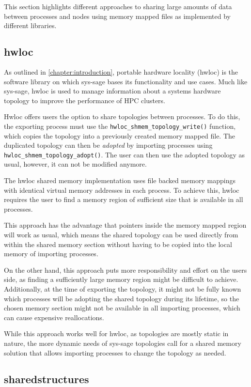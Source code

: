 This section highlights different approaches to sharing large amounts of data between processes and nodes using memory mapped files as implemented by different libraries.

\subsection*{hwloc}
As outlined in \autoref{chapter:introduction}, portable hardware locality (hwloc) is the software library on which sys-sage bases its functionality and use cases.
Much like sys-sage, hwloc is used to manage information about a systems hardware topology to improve the performance of HPC clusters.

Hwloc offers users the option to share topologies between processes. To do this, the exporting process must use the \lstinline|hwloc_shmem_topology_write()| function,
which copies the topology into a previously created memory mapped file. The duplicated topology can then be \emph{adopted} by importing processes using \lstinline|hwloc_shmem_topology_adopt()|.
The user can then use the adopted topology as usual, however, it can not be modified anymore. \cite{hwloc_docs}

The hwloc shared memory implementation uses file backed memory mappings with identical virtual memory addresses in each process.
To achieve this, hwloc requires the user to find a memory region of sufficient size that is available in all processes.

This approach has the advantage that pointers inside the memory mapped region will work as usual,
which means the shared topology can be used directly from within the shared memory section without having to be copied into the local memory of importing processes.

On the other hand, this approach puts more responsibility and effort on the users side, as finding a sufficiently large memory region might be difficult to achieve.
Additionally, at the time of exporting the topology, it might not be fully known which processes will be adopting the shared topology during its lifetime, so the chosen memory section might not be available in
all importing processes, which can cause expensive reallocations.

While this approach works well for hwloc, as topologies are mostly static in nature, the more dynamic needs of sys-sage topologies call for a shared memory solution that allows importing processes to change the topology as needed.

\subsection*{sharedstructures}

